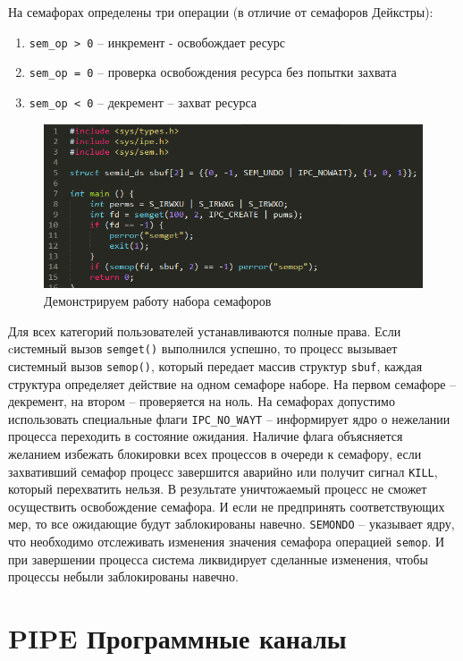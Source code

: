 На семафорах определены три операции (в отличие от семафоров Дейкстры):
\begin{enumerate}
    \item \verb|sem_op > 0| – инкремент - освобождает ресурс
    \item \verb|sem_op = 0| – проверка освобождения ресурса без попытки захвата
    \item \verb|sem_op < 0| – декремент – захват ресурса
\end{enumerate} 

\begin{figure}[H]
    \centering
    \includegraphics[width=\textwidth]{listing/3.png}
    \caption{Демонстрируем работу набора семафоров}
\end{figure}

Для всех категорий пользователей устанавливаются полные права. Если cистемный вызов \verb|semget()| выполнился успешно, то процесс вызывает системный вызов \verb|semop()|, который передает массив структур \verb|sbuf|, каждая структура определяет действие на одном семафоре наборе. На первом семафоре – декремент, на втором – проверяется на ноль. На семафорах допустимо использовать специальные флаги \verb|IPC_NO_WAYT| – информирует ядро о нежелании процесса переходить в состояние ожидания. Наличие флага объясняется желанием избежать блокировки всех процессов в очереди к семафору, если захвативший семафор процесс завершится аварийно или получит сигнал \verb|KILL|, который перехватить нельзя. В результате уничтожаемый процесс не сможет осуществить освобождение семафора.  И если не предпринять соответствующих мер, то все ожидающие будут заблокированы навечно. \verb|SEMONDO| – указывает ядру, что необходимо отслеживать изменения значения семафора операцией \verb|semop|. И при завершении процесса система ликвидирует сделанные изменения, чтобы процессы небыли заблокированы навечно.

\section{PIPE Программные каналы}

